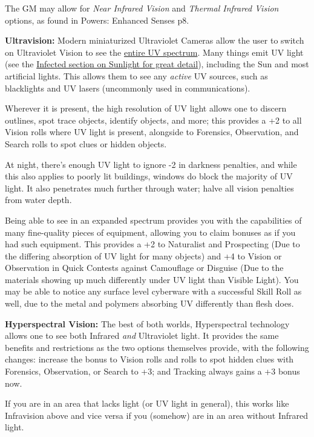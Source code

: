 \begin{multicols*}{3}
	The GM may allow for \textit{Near Infrared Vision} and \textit{Thermal Infrared Vision} options, as found in \GURPS Powers: Enhanced Senses p8.
	
	\textbf{Ultravision:} Modern miniaturized Ultraviolet Cameras allow the user to switch on Ultraviolet Vision to see the \textcolor{Blue}{\href{https://en.wikipedia.org/wiki/Ultraviolet}{entire UV spectrum}}. Many things emit UV light (see the \hyperref[sunlight]{Infected section on Sunlight for great detail}), including the Sun and most artificial lights. This allows them to see any \textit{active} UV sources, such as blacklights and UV lasers (uncommonly used in communications).
	
	Wherever it is present, the high resolution of UV light allows one to discern outlines, spot trace objects, identify objects, and more; this provides a +2 to all Vision rolls where UV light is present, alongside to Forensics, Observation, and Search rolls to spot clues or hidden objects.
	
	At night, there's enough UV light to ignore -2 in darkness penalties, and while this also applies to poorly lit buildings, windows do block the majority of UV light. It also penetrates much further through water; halve all vision penalties from water depth.
	
	Being able to see in an expanded spectrum provides you with the capabilities of many fine-quality pieces of equipment, allowing you to claim bonuses as if you had such equipment. This provides a +2 to Naturalist and Prospecting (Due to the differing absorption of UV light for many objects) and +4 to Vision or Observation in Quick Contests against Camouflage or Disguise (Due to the materials showing up much differently under UV light than Visible Light). You may be able to notice any surface level cyberware with a successful Skill Roll as well, due to the metal and polymers absorbing UV differently than flesh does.
	
	\textbf{Hyperspectral Vision:} The best of both worlds, Hyperspectral technology allows one to see both Infrared \textit{and} Ultraviolet light. It provides the same benefits and restrictions as the two options themselves provide, with the following changes: increase the bonus to Vision rolls and rolls to spot hidden clues with Forensics, Observation, or Search to +3; and Tracking always gains a +3 bonus now.
	
	If you are in an area that lacks light (or UV light in general), this works like Infravision above and vice versa if you (somehow) are in an area without Infrared light.
	

\end{multicols*}
